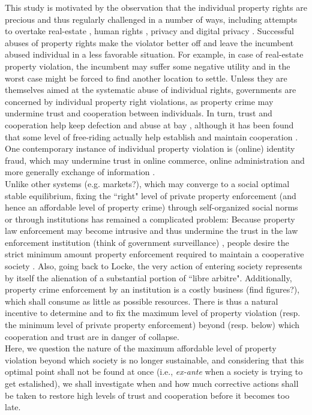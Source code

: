 This study is motivated by the observation that the individual property rights are precious and thus regularly challenged in a number of ways, including attempts to overtake real-estate \cite{anderson1975evolution}, human rights \cite{}, privacy \cite{warren1890right} and digital privacy \cite{acquisti2013privacy}. Successful abuses of property rights make the violator better off and leave the incumbent abused individual in a less favorable situation. For example, in case of real-estate property violation, the incumbent may suffer some negative utility and in the worst case might be forced to find another location to settle. Unless they are themselves aimed at the systematic abuse of individual rights, governments are concerned by individual property right violations, as property crime may undermine trust and cooperation between individuals. In turn, trust and cooperation help keep defection and abuse at bay \cite{}, although it has been found that some level of free-riding actually help establish and maintain cooperation \cite{}. One contemporary instance of individual property violation is (online) identity fraud, which may undermine trust in online commerce, online administration and more generally exchange of information \cite{}.\\

Unlike other systems (e.g. markets?), which may converge to a social optimal stable equilibrium, fixing the ``right" level of private property enforcement (and hence an affordable level of property crime) through self-organized social norms or through institutions has remained a complicated problem: Because property law enforcement may become intrusive and thus undermine the trust in the law enforcement institution (think of government surveillance) \cite{johnsongovernment}, people desire the strict minimum amount property enforcement required to maintain a cooperative society . Also, going back to Locke, the very action of entering society represents by itself the alienation of a substantial portion of ``libre arbitre". Additionally, property crime enforcement by an institution is a costly business (find figures?), which shall consume as little as possible resources. There is thus a natural incentive to determine and to fix the maximum level of property violation (resp. the minimum level of private property enforcement) beyond (resp. below) which cooperation and trust are in danger of collapse.\\

Here, we question the nature of the maximum affordable level of property violation beyond which society is no longer sustainable, and considering that this optimal point shall not be found at once (i.e., {\it ex-ante} when a society is trying to get estalished), we shall investigate when and how much corrective actions shall be taken to restore high levels of trust and cooperation before it becomes too late.\\

